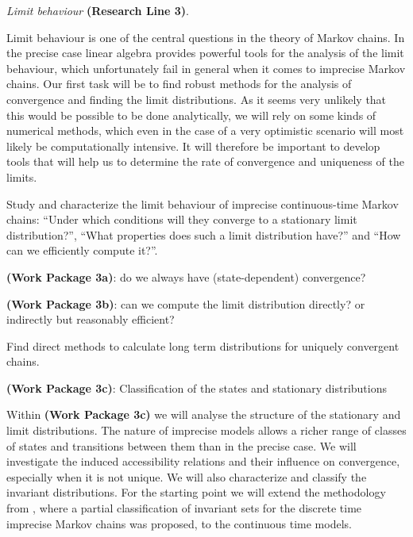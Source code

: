 \documentclass[11pt,dvipsnames,usenames,a4paper]{article}
\begin{document}
\vspace{5pt}
\emph{Limit behaviour} {\bf (Research Line 3)}.
\vspace{3pt}


Limit behaviour is one of the central questions in the theory of Markov chains. In the precise case linear algebra provides powerful tools for the analysis of the limit behaviour, which unfortunately fail in general when it comes to imprecise Markov chains. 
Our first task will be to find robust methods for the analysis of convergence and finding the limit distributions. 
As it seems very unlikely that this would be possible to be done analytically, we will rely on some kinds of numerical methods, which even in the case of a very optimistic scenario will most likely be computationally intensive. 
It will therefore be important to develop tools that will help us to determine the rate of convergence and uniqueness of the limits. 




Study and characterize the limit behaviour of imprecise continuous-time Markov chains: ``Under which conditions will they converge to a stationary limit distribution?'', ``What properties does such a limit distribution have?'' and ``How can we efficiently compute it?''. 

{\bf (Work Package 3a)}: do we always have (state-dependent) convergence?


{\bf (Work Package 3b)}: can we compute the limit distribution directly? or indirectly but reasonably efficient?

Find direct methods to calculate long term distributions for uniquely convergent chains. 




{\bf (Work Package 3c)}: Classification of the states and stationary distributions

Within {\bf (Work Package 3c)} we will analyse the structure of the stationary and limit distributions. The nature of imprecise models allows a richer range of classes of states and transitions between them than in the precise case. We will investigate the induced accessibility relations and their influence on convergence, especially when it is not unique. We will also characterize and classify the invariant distributions. For the starting point we will extend the methodology from \cite{skulj:13b}, where a partial classification of invariant sets for the discrete time imprecise Markov chains was proposed, to the continuous time models. 
\end{document}
